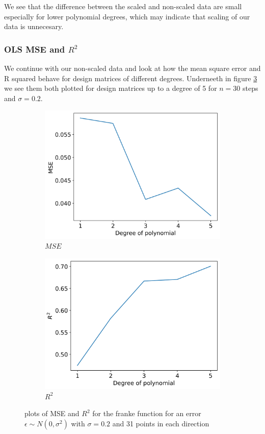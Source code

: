 \documentclass[12pt]{article}
\begin{document}
We see that the difference between the scaled and non-scaled data are small especially for lower polynomial degrees, which may indicate that scaling of our data is unnecesary.

\subsubsection{OLS MSE and $R^2$}

We continue with our non-scaled data and look at how the mean square error and R squared behave for design matrices of different degrees. Underneeth in figure \ref{fig:r2_mse_5} we see them both plotted for design matrices up to a degree of 5 for $n=30$ steps and $\sigma=0.2$.
\begin{figure}[H]
  \begin{subfigure}{.5\textwidth}
    \centering
    \includegraphics[width=\textwidth]{../figures/mse_ols_5.png}
    \caption{$MSE$}
    \label{fig:}
  \end{subfigure}
  \begin{subfigure}{.5\textwidth}
    \centering
    \includegraphics[width=\textwidth]{../figures/r2_ols_5.png}
    \caption{$R^2$}
    \label{fig:}
  \end{subfigure}
  \caption{plots of MSE and $R^2$ for the franke function for an error $\epsilon \sim N(0, \sigma^2)$ with $\sigma=0.2$ and 31 points in each direction}
  \label{fig:r2_mse_5}
\end{figure}
\end{document}
